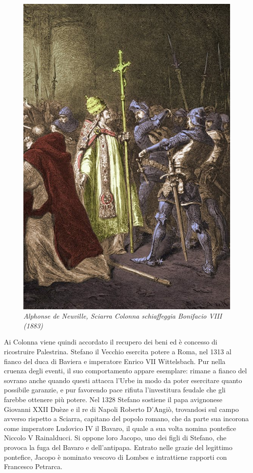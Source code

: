 \documentclass[
  letterpaper,
  DIV=11,
  numbers=noendperiod]{scrartcl}
\begin{document}
\begin{figure}[H]

{\centering \includegraphics{../../images/2024/san_rocco/4AlphonsedeNeuville-SchiaffodiAnagni1883.jpg}

}

\caption{\emph{Alphonse de Neuville, Sciarra Colonna schiaffeggia
Bonifacio VIII (1883)}}

\end{figure}%

Ai Colonna viene quindi accordato il recupero dei beni ed è concesso di
ricostruire Palestrina. Stefano il Vecchio esercita potere a Roma, nel
1313 al fianco del duca di Baviera e imperatore Enrico VII Wittelsbach.
Pur nella cruenza degli eventi, il suo comportamento appare esemplare:
rimane a fianco del sovrano anche quando questi attacca l'Urbe in modo
da poter esercitare quanto possibile garanzie, e pur favorendo pace
rifiuta l'investitura feudale che gli farebbe ottenere più potere. Nel
1328 Stefano sostiene il papa avignonese Giovanni XXII Duèze e il re di
Napoli Roberto D'Angiò, trovandosi sul campo avverso rispetto a Sciarra,
capitano del popolo romano, che da parte sua incorona come imperatore
Ludovico IV il Bavaro, il quale a sua volta nomina pontefice Niccolo V
Rainalducci. Si oppone loro Jacopo, uno dei figli di Stefano, che
provoca la fuga del Bavaro e dell'antipapa. Entrato nelle grazie del
legittimo pontefice, Jacopo è nominato vescovo di Lombes e intrattiene
rapporti con Francesco Petrarca.
\end{document}
